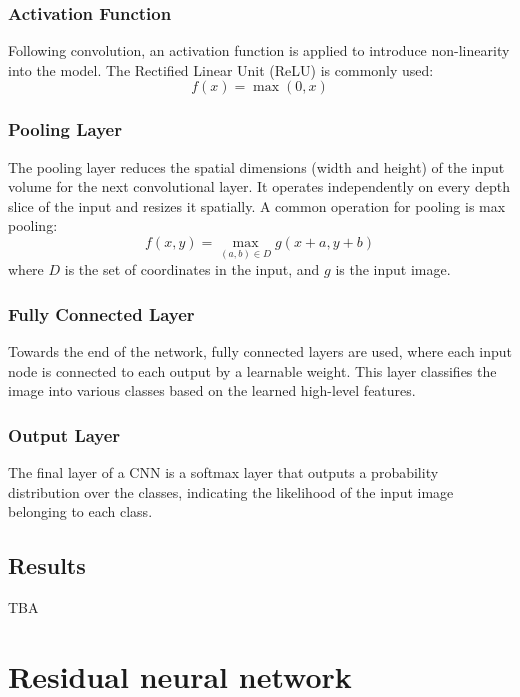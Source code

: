\subsubsection{Activation Function}
Following convolution, an activation function is applied to introduce non-linearity into the model. The Rectified Linear Unit (ReLU) is commonly used:
\[f(x) = \max(0, x)\]

\subsubsection{Pooling Layer}
The pooling layer reduces the spatial dimensions (width and height) of the input volume for the next convolutional layer. It operates independently on every depth slice of the input and resizes it spatially. A common operation for pooling is max pooling:
\[f(x, y) = \max_{(a,b) \in D} g(x+a, y+b)\]
where \(D\) is the set of coordinates in the input, and \(g\) is the input image.

\subsubsection{Fully Connected Layer}
Towards the end of the network, fully connected layers are used, where each input node is connected to each output by a learnable weight. This layer classifies the image into various classes based on the learned high-level features.

\subsubsection{Output Layer}
The final layer of a CNN is a softmax layer that outputs a probability distribution over the classes, indicating the likelihood of the input image belonging to each class.


\subsection{Results}
TBA






\section{Residual neural network}


